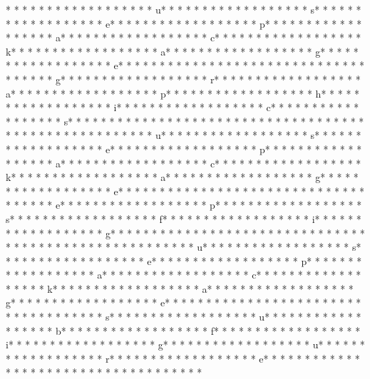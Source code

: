 * * *  * * *  * * *  *  * * *  *  * * *  * u* * *  * * *  * * *  *  * * *  *  * * *  * s* * *  * * *  * * *  *  * * *  *  * * *  * e* * *  * * *  * * *  *  * * *  *  * * *  * p* * *  * * *  * * *  *  * * *  *  * * *  * a* * *  * * *  * * *  *  * * *  *  * * *  * c* * *  * * *  * * *  *  * * *  *  * * *  * k* * *  * * *  * * *  *  * * *  *  * * *  * a* * *  * * *  * * *  *  * * *  *  * * *  * g* * *  * * *  * * *  *  * * *  *  * * *  * e* * *  * * *  * * *  *  * * *  *  * * *  * {* * *  * * *  * * *  *  * * *  *  * * *  * g* * *  * * *  * * *  *  * * *  *  * * *  * r* * *  * * *  * * *  *  * * *  *  * * *  * a* * *  * * *  * * *  *  * * *  *  * * *  * p* * *  * * *  * * *  *  * * *  *  * * *  * h* * *  * * *  * * *  *  * * *  *  * * *  * i* * *  * * *  * * *  *  * * *  *  * * *  * c* * *  * * *  * * *  *  * * *  *  * * *  * s* * *  * * *  * * *  *  * * *  *  * * *  * }* * *  * * *  * * *  *  * * *  *  * * *  * 
* * *  * * *  * * *  *  * * *  *  * * *  * u* * *  * * *  * * *  *  * * *  *  * * *  * s* * *  * * *  * * *  *  * * *  *  * * *  * e* * *  * * *  * * *  *  * * *  *  * * *  * p* * *  * * *  * * *  *  * * *  *  * * *  * a* * *  * * *  * * *  *  * * *  *  * * *  * c* * *  * * *  * * *  *  * * *  *  * * *  * k* * *  * * *  * * *  *  * * *  *  * * *  * a* * *  * * *  * * *  *  * * *  *  * * *  * g* * *  * * *  * * *  *  * * *  *  * * *  * e* * *  * * *  * * *  *  * * *  *  * * *  * {* * *  * * *  * * *  *  * * *  *  * * *  * e* * *  * * *  * * *  *  * * *  *  * * *  * p* * *  * * *  * * *  *  * * *  *  * * *  * s* * *  * * *  * * *  *  * * *  *  * * *  * f* * *  * * *  * * *  *  * * *  *  * * *  * i* * *  * * *  * * *  *  * * *  *  * * *  * g* * *  * * *  * * *  *  * * *  *  * * *  * }* * *  * * *  * * *  *  * * *  *  * * *  * 
* * *  * * *  * * *  *  * * *  *  * * *  * u* * *  * * *  * * *  *  * * *  *  * * *  * s* * *  * * *  * * *  *  * * *  *  * * *  * e* * *  * * *  * * *  *  * * *  *  * * *  * p* * *  * * *  * * *  *  * * *  *  * * *  * a* * *  * * *  * * *  *  * * *  *  * * *  * c* * *  * * *  * * *  *  * * *  *  * * *  * k* * *  * * *  * * *  *  * * *  *  * * *  * a* * *  * * *  * * *  *  * * *  *  * * *  * g* * *  * * *  * * *  *  * * *  *  * * *  * e* * *  * * *  * * *  *  * * *  *  * * *  * {* * *  * * *  * * *  *  * * *  *  * * *  * s* * *  * * *  * * *  *  * * *  *  * * *  * u* * *  * * *  * * *  *  * * *  *  * * *  * b* * *  * * *  * * *  *  * * *  *  * * *  * f* * *  * * *  * * *  *  * * *  *  * * *  * i* * *  * * *  * * *  *  * * *  *  * * *  * g* * *  * * *  * * *  *  * * *  *  * * *  * u* * *  * * *  * * *  *  * * *  *  * * *  * r* * *  * * *  * * *  *  * * *  *  * * *  * e* * *  * * *  * * *  *  * * *  *  * * *  * }* * *  * * *  * * *  *  * * *  *  * * *  * 
